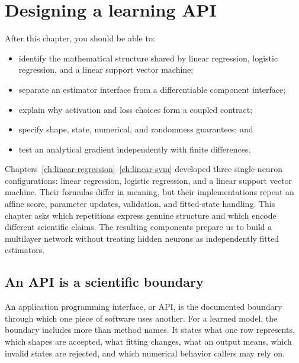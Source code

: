 \chapter{Designing a learning API}
\label{ch:learning-api}

\begin{learningobjectives}
After this chapter, you should be able to:
\begin{itemize}
  \item identify the mathematical structure shared by linear regression,
  logistic regression, and a linear support vector machine;
  \item separate an estimator interface from a differentiable component
  interface;
  \item explain why activation and loss choices form a coupled contract;
  \item specify shape, state, numerical, and randomness guarantees; and
  \item test an analytical gradient independently with finite differences.
\end{itemize}
\end{learningobjectives}

\begin{chapterconnection}
Chapters~\ref{ch:linear-regression}--\ref{ch:linear-svm} developed three
single-neuron configurations: linear regression, logistic regression, and a
linear support vector machine. Their formulas differ in meaning, but their
implementations repeat an affine score, parameter updates, validation, and
fitted-state handling. This chapter asks which repetitions express genuine
structure and which encode different scientific claims. The resulting
components prepare us to build a multilayer network without treating hidden
neurons as independently fitted estimators.
\end{chapterconnection}

\section{An API is a scientific boundary}

An application programming interface, or API, is the documented boundary
through which one piece of software uses another. For a learned model, the
boundary includes more than method names. It states what one row represents,
which shapes are accepted, what fitting changes, what an output means, which
invalid states are rejected, and which numerical behavior callers may rely on.

